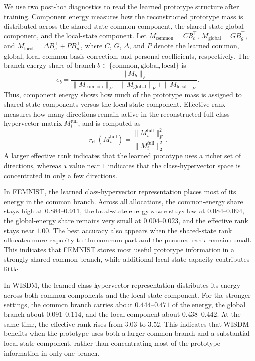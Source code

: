 \documentclass[lettersize,journal]{IEEEtran}
\newcommand{\rev}[1]{#1}
\begin{document}
We use two post-hoc diagnostics to read the learned prototype structure after training. 
\rev{Component energy measures how the reconstructed prototype mass is distributed across the shared-state common component, the shared-state global component, and the local-state component.}
Let
\(M_{\mathrm{common}}=C B_c^\top\), \(M_{\mathrm{global}}=G B_g^\top\), and \rev{\(M_{\mathrm{local}}=\Delta B_c^\top + P B_p^\top\)},
where \(C\), \(G\), \(\Delta\), and \(P\) denote the learned common, global, \rev{local common-basis correction}, and personal coefficients, respectively.
The branch-energy share of branch \(b\in\{\mathrm{common},\mathrm{global},\rev{\mathrm{local}}\}\) is
\begin{equation}
e_b=
\frac{\|M_b\|_F}
{\|M_{\mathrm{common}}\|_F+\|M_{\mathrm{global}}\|_F+\|\rev{M_{\mathrm{local}}}\|_F}.
\end{equation}
\rev{Thus, component energy shows how much of the prototype mass is assigned to shared-state components versus the local-state component.}
Effective rank measures how many directions remain active in the reconstructed full class-hypervector matrix \(M_i^{\mathrm{full}}\), and is computed as
\begin{equation}
r_{\mathrm{eff}}(M_i^{\mathrm{full}})=\frac{\|M_i^{\mathrm{full}}\|_F^2}{\|M_i^{\mathrm{full}}\|_2^2}.
\end{equation}
A larger effective rank indicates that the learned prototype uses a richer set of directions, whereas a value near \(1\) indicates that the class-hypervector space is concentrated in only a few directions.


In FEMNIST, the learned class-hypervector representation places most of its energy in the common branch.
Across all allocations, the common-energy share stays high at \(0.884\)--\(0.911\), the \rev{local-state energy share} stays low at \(0.084\)--\(0.094\), the global-energy share remains very small at \(0.004\)--\(0.023\), and the effective rank stays near \(1.00\).
The best accuracy also appears when the \rev{shared-state rank} allocates more capacity to the common part and the personal rank remains small.
This indicates that FEMNIST stores most useful prototype information in a strongly shared common branch, while additional \rev{local-state capacity} contributes little.

In WISDM, the learned class-hypervector representation distributes its energy across both \rev{common components and the local-state component}.
For the stronger settings, the common branch carries about \(0.444\)--\(0.471\) of the energy, the global branch about \(0.091\)--\(0.114\), and the \rev{local component} about \(0.438\)--\(0.442\).
At the same time, the effective rank rises from \(3.03\) to \(3.52\).
This indicates that WISDM benefits when the prototype uses both a larger common branch and a substantial \rev{local-state component}, rather than concentrating most of the prototype information in only one branch.
\end{document}
